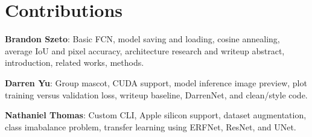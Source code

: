 \section*{Contributions}

\textbf{Brandon Szeto}: Basic FCN, model saving and loading, cosine annealing, average IoU and pixel accuracy, architecture research and writeup abstract, introduction, related works, methods.

\textbf{Darren Yu}: Group mascot, CUDA support, model inference image preview, plot training versus validation loss, writeup baseline, DarrenNet, and clean/style code.

\textbf{Nathaniel Thomas}: Custom CLI, Apple silicon support, dataset augmentation, class imabalance problem, transfer learning using ERFNet, ResNet, and UNet.
